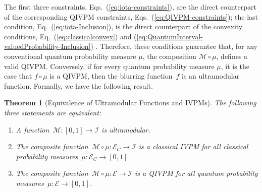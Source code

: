\documentclass[english,reprint, aps, prl,superscriptaddress, showpacs,
showkeys, longbibliography, amsmath, amssymb, floatfix]{revtex4-1}
\theoremstyle{plain}
\newtheorem{thm}{Theorem}
\theoremstyle{definition}
\newcommand{\events}{\ensuremath{\mathcal{E}}}
\newcommand{\ultramodular}{\mathcal{M}}
\newcommand{\eventsC}{\ensuremath{\events_{C}}}
\begin{document}
\noindent The first three constraints,
Eqs.~(\ref{eq:iota-constraints}), are the direct counterpart of the
corresponding QIVPM constraints, Eqs.~(\ref{eq:QIVPM-constraints});
the last condition, Eq.~(\ref{eq:iota-Inclusion}), is the direct
counterpart of the convexity conditions,
Eq.~(\ref{eq:classicalconvex}) and
(\ref{eq:QuantumInterval-valuedProbability-Inclusion})
\cite{Choquet1954,Shapley1971,NgMoYeh1997,MarinacciMontrucchio2005}. Therefore,
these conditions guarantee that, for any conventional quantum
probability measure $\mu$, the composition $\ultramodular \circ \mu$,
defines a valid QIVPM. Conversely, if for every quantum probability
measure $\mu$, it is the case that $f \circ \mu$ is a QIVPM, then the blurring
function~$f$ is an ultramodular function. Formally, we have the following
result.

\begin{thm}[Equivalence of Ultramodular Functions and IVPMs]\label{thm:iota-statements}The
following three statements are equivalent:
\begin{enumerate}
\item \label{enu:iota-subject-to}A function~$\ultramodular:\left[0,1\right]\rightarrow\mathscr{I}$
is ultramodular.
\item \label{enu:iota-mu-CIVPM}The composite
  function~$\ultramodular\circ\mu:\eventsC\rightarrow\mathscr{I}$
  is a classical IVPM for all classical probability
  measures~$\mu:\eventsC\rightarrow\left[0,1\right]$.
\item \label{enu:iota-mu-QIVPM}The composite
  function~$\ultramodular\circ\mu:\events\rightarrow\mathscr{I}$ is a
  QIVPM for all quantum probability
  measures~$\mu:\events\rightarrow\left[0,1\right]$.
\end{enumerate}
\end{thm}
\end{document}
